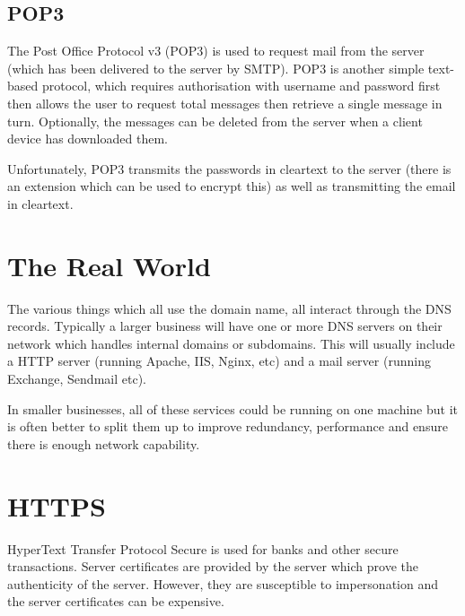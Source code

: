 \subsection*{POP3}
The Post Office Protocol v3 (POP3) is used to request mail from the server (which has been delivered to the server by SMTP). POP3 is another simple text-based protocol, which requires authorisation with username and password first then allows the user to request total messages then retrieve a single message in turn. Optionally, the messages can be deleted from the server when a client device has downloaded them. 

Unfortunately, POP3 transmits the passwords in cleartext to the server (there is an extension which can be used to encrypt this) as well as transmitting the email in cleartext. 

\section*{The Real World}
The various things which all use the domain name, all interact through the DNS records. Typically a larger business will have one or more DNS servers on their network which handles internal domains or subdomains. This will usually include a HTTP server (running Apache, IIS, Nginx, etc) and a mail server (running Exchange, Sendmail etc).

In smaller businesses, all of these services could be running on one machine but it is often better to split them up to improve redundancy, performance and ensure there is enough network capability. 

\section*{HTTPS}
HyperText Transfer Protocol Secure is used for banks and other secure transactions. Server certificates are provided by the server which prove the authenticity of the server. However, they are susceptible to impersonation and the server certificates can be expensive. 